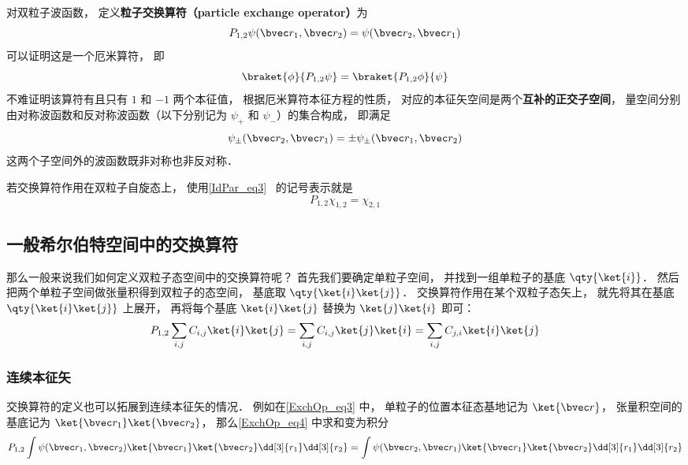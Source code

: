 

对双粒子波函数， 定义\textbf{粒子交换算符（particle exchange operator）}为
\begin{equation}\label{ExchOp_eq3}
P_{1,2}\psi(\bvec r_1, \bvec r_2) = \psi(\bvec r_2, \bvec r_1)
\end{equation}
可以证明这是一个厄米算符， 即
\begin{equation}
\braket{\phi}{P_{1,2}\psi} = \braket{P_{1,2}\phi}{\psi}
\end{equation}
不难证明该算符有且只有 $1$ 和 $-1$ 两个本征值， 根据厄米算符本征方程的性质， 对应的本征矢空间是两个\textbf{互补的正交子空间}， 量空间分别由对称波函数和反对称波函数（以下分别记为 $\psi_+$ 和 $\psi_-$）的集合构成， 即满足
\begin{equation}
\psi_\pm(\bvec r_2, \bvec r_1) = \pm\psi_\pm(\bvec r_1, \bvec r_2)
\end{equation}
这两个子空间外的波函数既非对称也非反对称．

若交换算符作用在双粒子自旋态上， 使用\autoref{IdPar_eq3}~ 的记号表示就是
\begin{equation}\label{ExchOp_eq6}
P_{1,2}\chi_{1,2} = \chi_{2,1}
\end{equation}

\subsection{一般希尔伯特空间中的交换算符}
那么一般来说我们如何定义双粒子态空间中的交换算符呢？ 首先我们要确定单粒子空间， 并找到一组单粒子的基底 $\qty{\ket{i}}$． 然后把两个单粒子空间做张量积得到双粒子的态空间， 基底取 $\qty{\ket{i}\ket{j}}$． 交换算符作用在某个双粒子态矢上， 就先将其在基底 $\qty{\ket{i}\ket{j}}$ 上展开， 再将每个基底 $\ket{i}\ket{j}$ 替换为 $\ket{j}\ket{i}$ 即可：
\begin{equation}\label{ExchOp_eq4}
P_{1,2} \sum_{i,j} C_{i,j} \ket{i}\ket{j} = \sum_{i,j} C_{i,j} \ket{j}\ket{i} = \sum_{i,j} C_{j,i} \ket{i}\ket{j}
\end{equation}

\subsubsection{连续本征矢}
交换算符的定义也可以拓展到连续本征矢的情况． 例如在\autoref{ExchOp_eq3} 中， 单粒子的位置本征态基地记为 $\ket{\bvec r}$， 张量积空间的基底记为 $\ket{\bvec r_1}\ket{\bvec r_2}$， 那么\autoref{ExchOp_eq4} 中求和变为积分
\begin{equation}
P_{1,2} \int \psi(\bvec r_1, \bvec r_2) \ket{\bvec r_1}\ket{\bvec r_2} \dd[3]{r_1} \dd[3]{r_2} = \int \psi(\bvec r_2, \bvec r_1) \ket{\bvec r_1}\ket{\bvec r_2} \dd[3]{r_1} \dd[3]{r_2}
\end{equation}

